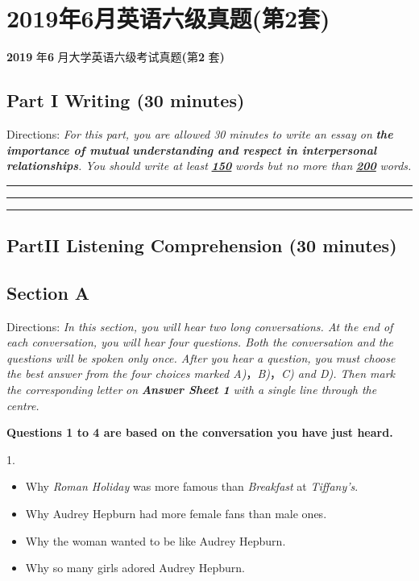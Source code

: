 \documentclass[UTF8,11pt]{ctexart}
\begin{document}
\section*{2019年6月英语六级真题(第2套)}
\textbf{2019} 年\textbf{6} 月大学英语六级考试真题\textbf{(}第\textbf{2} 套\textbf{)}


\subsection*{\textbf{Part I} \textbf{Writing} \textbf{(30 minutes)}}


Directions:\textit{ For this part, you are allowed 30 minutes to write an essay on}\textbf{\textit{ the importance of mutual}} \textbf{\textit{understanding and respect in interpersonal relationships}}\textit{. You should write at least}\textbf{\textit{ }}\textbf{\textit{\uline{150}}}\textit{ words but no more than} \textbf{\textit{\uline{200}}}\textit{ words.} \par\noindent\rule{.95\linewidth}{.4pt}\par  \par\noindent\rule{.95\linewidth}{.4pt}\par  \par\noindent\rule{.95\linewidth}{.4pt}\par


\subsection*{\textbf{Part}II \textbf{Listening Comprehension} \textbf{(30 minutes)}}


\subsection*{\textbf{Section A}}


Directions:\textit{ In this section, you will hear two long conversations. At the end of each conversation, you will hear} \textit{four questions. Both the conversation and the questions will be spoken only once. After you hear a question, you} \textit{must choose the best answer from the four choices marked A)}，\textit{B)}，\textit{C) and D). Then mark the corresponding letter} \textit{on}\textbf{\textit{ Answer Sheet 1}}\textit{ with a single line through the centre.}


\textbf{Questions 1 to 4 are based on the conversation you have just heard.}


1.


\begin{itemize}[leftmargin=2em,itemsep=.2em,topsep=.4em]\item[A.] Why\textit{ Roman Holiday} was more famous than\textit{ Breakfast} at\textit{ Tiffany’s}.
\item[B.] Why Audrey Hepburn had more female fans than male ones.
\item[C.] Why the woman wanted to be like Audrey Hepburn.
\item[D.] Why so many girls adored Audrey Hepburn.
\end{itemize}
\end{document}
